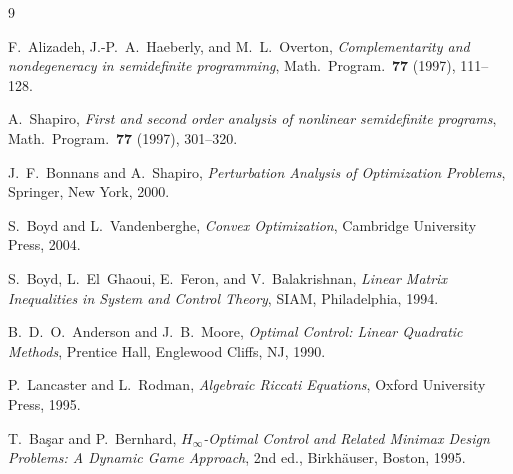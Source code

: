 \documentclass[11pt]{article}
\theoremstyle{definition}
\begin{document}
\begin{thebibliography}{9}

F.~Alizadeh, J.-P.~A.~Haeberly, and M.~L.~Overton,
\emph{Complementarity and nondegeneracy in semidefinite programming},
Math.\ Program.\ \textbf{77} (1997), 111--128.

A.~Shapiro,
\emph{First and second order analysis of nonlinear semidefinite programs},
Math.\ Program.\ \textbf{77} (1997), 301--320.

J.~F.~Bonnans and A.~Shapiro,
\emph{Perturbation Analysis of Optimization Problems},
Springer, New York, 2000.

S.~Boyd and L.~Vandenberghe,
\emph{Convex Optimization},
Cambridge University Press, 2004.

S.~Boyd, L.~El~Ghaoui, E.~Feron, and V.~Balakrishnan,
\emph{Linear Matrix Inequalities in System and Control Theory},
SIAM, Philadelphia, 1994.

B.~D.~O.~Anderson and J.~B.~Moore,
\emph{Optimal Control: Linear Quadratic Methods},
Prentice Hall, Englewood Cliffs, NJ, 1990.

P.~Lancaster and L.~Rodman,
\emph{Algebraic Riccati Equations},
Oxford University Press, 1995.

T.~Ba\c{s}ar and P.~Bernhard,
\emph{$H_\infty$-Optimal Control and Related Minimax Design Problems:
A Dynamic Game Approach}, 2nd ed.,
Birkh\"auser, Boston, 1995.

\end{thebibliography}
\end{document}
